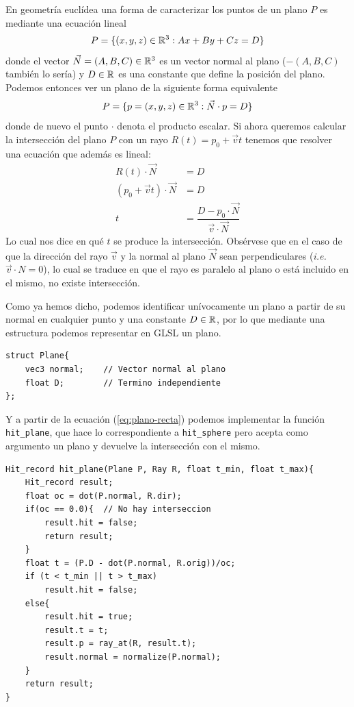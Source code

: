 En geometría euclídea una forma de caracterizar los puntos de un plano $P$ es mediante una ecuación lineal
$$
P = \{(x,y,z)\in\mathbb{R}^3:Ax+By+Cz=D\}
$$
donde el vector $\vec N=(A,B,C)\in\mathbb{R}^3$ es un vector normal al plano ($-(A,B,C)$ también lo sería) y $D\in\mathbb{R}$ es una constante que define la posición del plano. Podemos entonces ver un plano de la siguiente forma equivalente
$$
P = \{p=(x,y,z)\in\mathbb{R}^3:\vec N\cdot p = D\}
$$
donde de nuevo el punto $\cdot$ denota el producto escalar. Si ahora queremos calcular la intersección del plano $P$ con un rayo $R(t)=p_0+\vec vt$ tenemos que resolver una ecuación que además es lineal:
\begin{equation}
    \label{eq:plano-recta}
    \begin{split}
        R(t)\cdot \vec N &= D \\
        (p_0+\vec vt)\cdot \vec N & = D\\
        t &=\dfrac{D-p_0\cdot \vec N}{\vec v\cdot \vec N}
    \end{split}
\end{equation}
Lo cual nos dice en qué $t$ se produce la intersección. Obsérvese que en el caso de que la dirección del rayo $\vec v$ y la normal al plano $\vec N$ sean perpendiculares (\textit{i.e.} $\vec v\cdot N=0$), lo cual se traduce en que el rayo es paralelo al plano o está incluido en el mismo, no existe intersección.

Como ya hemos dicho, podemos identificar unívocamente un plano a partir de su normal en cualquier punto y una constante $D\in\mathbb{R}$, por lo que mediante una estructura podemos representar en GLSL un plano.

\begin{lstlisting}
struct Plane{
    vec3 normal;    // Vector normal al plano
    float D;        // Termino independiente
};
\end{lstlisting}

Y a partir de la ecuación (\ref{eq:plano-recta}) podemos implementar la función \verb|hit_plane|, que hace lo correspondiente a \verb|hit_sphere| pero acepta como argumento un plano y devuelve la intersección con el mismo.

\begin{lstlisting}
Hit_record hit_plane(Plane P, Ray R, float t_min, float t_max){
    Hit_record result;
    float oc = dot(P.normal, R.dir);
    if(oc == 0.0){  // No hay interseccion
        result.hit = false;
        return result;
    }
    float t = (P.D - dot(P.normal, R.orig))/oc;
    if (t < t_min || t > t_max)
        result.hit = false;
    else{
        result.hit = true;
        result.t = t;
        result.p = ray_at(R, result.t);
        result.normal = normalize(P.normal);
    }
    return result;
}
\end{lstlisting}

